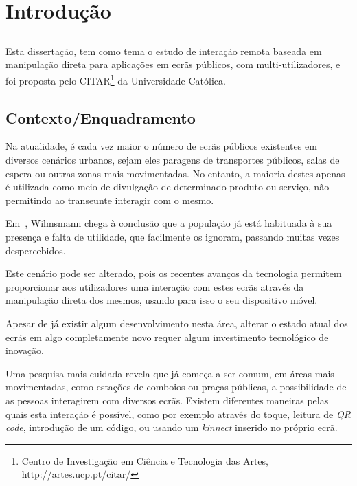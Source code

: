 \chapter{Introdução} \label{chap:intro}

\section*{}
 
Esta dissertação, tem como tema o estudo de interação remota baseada em manipulação direta para aplicações em ecrãs públicos, com multi-utilizadores, e foi proposta pelo CITAR\footnote{Centro de Investigação em Ciência e Tecnologia das Artes, http://artes.ucp.pt/citar/} da Universidade Católica.  

\section{Contexto/Enquadramento} \label{sec:context}

Na atualidade, é cada vez maior o número de ecrãs públicos existentes em diversos cenários urbanos, sejam eles paragens de transportes públicos, salas de espera ou outras zonas mais movimentadas. No entanto, a maioria destes apenas é utilizada como meio de divulgação de determinado produto ou serviço, não permitindo ao transeunte interagir com o mesmo. 

Em~\cite{Wilmsmann}, Wilmsmann chega à conclusão que a população já está habituada à sua presença e falta de utilidade, que facilmente os ignoram, passando muitas vezes despercebidos. 

Este cenário pode ser alterado, pois os recentes avanços da tecnologia permitem proporcionar aos utilizadores uma interação com estes ecrãs através da manipulação direta dos mesmos, usando para isso o seu dispositivo móvel.

Apesar de já existir algum desenvolvimento nesta área, alterar o estado atual dos ecrãs em algo completamente novo requer algum investimento tecnológico de inovação.

Uma pesquisa mais cuidada revela que já começa a ser comum, em áreas mais movimentadas, como estações de comboios ou praças públicas, a possibilidade de as pessoas interagirem com diversos ecrãs. Existem diferentes maneiras pelas quais esta interação é possível, como por exemplo através do toque, leitura de \textit{QR code}, introdução de um código, ou usando um \textit{kinnect} inserido no próprio ecrã. 

